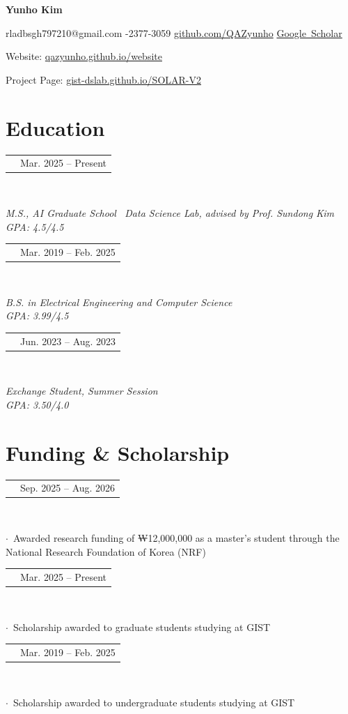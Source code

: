 \documentclass[10.5pt,a4paper]{article}
\makeatletter
\newcommand{\entry}[3]{%
  \noindent\begin{tabularx}{\linewidth}{@{}>{\raggedright\arraybackslash}X r@{}}
    {\hyphenpenalty=10000\exhyphenpenalty=10000\textbf{#1}} & \textcolor{textgray}{#2}
  \end{tabularx}\\
  {\raggedright\textit{\textcolor{textgray}{#3}}\par}\vspace{0.5em}
}
\newcommand{\fund}[3]{%
  \noindent\begin{tabularx}{\linewidth}{@{}>{\raggedright\arraybackslash}X r@{}}
    {\hyphenpenalty=10000\exhyphenpenalty=10000\textbf{#1}} & \textcolor{textgray}{#2}
  \end{tabularx}\\
  {\raggedright\textcolor{textgray}{$\cdot$\ #3}\par}\vspace{0.5em}
}
\makeatother
\begin{document}
{\centering
  {\Huge\bfseries Yunho Kim}\par
  \vspace{0.4em}
  \color{textgray}
  rladbsgh797210@gmail.com
  \;\textbar{}-2377-3059
  \;\textbar\;
  \href{https://github.com/QAZyunho}{github.com/QAZyunho}
  \;\textbar\;
  \href{https://scholar.google.com/citations?user=fFWoy8gAAAAJ&hl=en}{\mbox{Google Scholar}}
  \par
  \vspace{0.15em}
  Website: \href{https://qazyunho.github.io/website/}{qazyunho.github.io/website}\par
  Project Page: \href{https://gist-dslab.github.io/SOLAR-V2/}{gist-dslab.github.io/SOLAR-V2}
  \par
}

\vspace{0.8em}

\section{Education}

\entry{Gwangju Institute of Science and Technology (GIST)}{Mar. 2025 -- Present}
{M.S., AI Graduate School \,\textbar\; Data Science Lab, advised by Prof. Sundong Kim\\[0.2em]GPA: 4.5/4.5}

\entry{Gwangju Institute of Science and Technology (GIST)}{Mar. 2019 -- Feb. 2025}
{B.S. in Electrical Engineering and Computer Science\\[0.2em]GPA: 3.99/4.5}

\entry{University of California, Berkeley}{Jun. 2023 -- Aug. 2023}
{Exchange Student, Summer Session\\[0.2em]GPA: 3.50/4.0}

\section{Funding \& Scholarship}

\fund{National Research Foundation of Korea Funding, NRF}{Sep. 2025 -- Aug. 2026}
{Awarded research funding of {\cjkfont ₩}12,000,000 as a master's student through the National Research Foundation of Korea (NRF)}

\fund{Korean Government Scholarships, GIST College}{Mar. 2025 -- Present}
{Scholarship awarded to graduate students studying at GIST}

\fund{Korean Government Scholarships, GIST College}{Mar. 2019 -- Feb. 2025}
{Scholarship awarded to undergraduate students studying at GIST}
\end{document}

